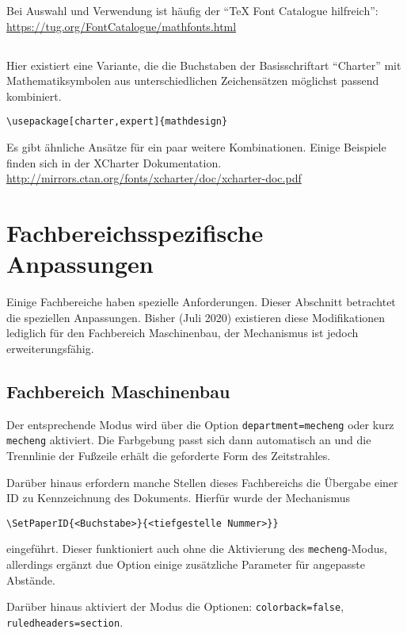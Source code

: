 \documentclass[
	ngerman,
	accentcolor=9c,%
	]{tudapub}
\let\code\texttt
\begin{document}
Bei Auswahl und Verwendung ist häufig der \enquote{\TeX{} Font Catalogue hilfreich}: \url{https://tug.org/FontCatalogue/mathfonts.html}

\subsection{}
Hier existiert eine Variante, die die Buchstaben der Basisschriftart \enquote{Charter} mit Mathematiksymbolen aus unterschiedlichen Zeichensätzen möglichst passend kombiniert.

\begin{verbatim}
\usepackage[charter,expert]{mathdesign}
\end{verbatim}

Es gibt ähnliche Ansätze für ein paar weitere Kombinationen. Einige Beispiele finden sich in der XCharter Dokumentation. \url{http://mirrors.ctan.org/fonts/xcharter/doc/xcharter-doc.pdf}


\section{Fachbereichsspezifische Anpassungen}
Einige Fachbereiche haben spezielle Anforderungen. Dieser Abschnitt betrachtet die speziellen Anpassungen. Bisher (Juli 2020) existieren diese Modifikationen lediglich für den Fachbereich Maschinenbau, der Mechanismus ist jedoch erweiterungsfähig.


\subsection{Fachbereich Maschinenbau}
Der entsprechende Modus wird über die Option \code{department=mecheng} oder kurz \code{mecheng} aktiviert. Die Farbgebung passt sich dann automatisch an und die Trennlinie der Fußzeile erhält die geforderte Form des Zeitstrahles. 

Darüber hinaus erfordern manche Stellen dieses Fachbereichs die Übergabe einer ID zu Kennzeichnung des Dokuments. Hierfür wurde der Mechanismus
\begin{verbatim}
\SetPaperID{<Buchstabe>}{<tiefgestelle Nummer>}}
\end{verbatim}
eingeführt.
Dieser funktioniert auch ohne die Aktivierung des \code{mecheng}-Modus, allerdings ergänzt due Option einige zusätzliche Parameter für angepasste Abstände.

Darüber hinaus aktiviert der Modus die Optionen:
\code{colorback=false}, \code{ruledheaders=section}.
\end{document}
